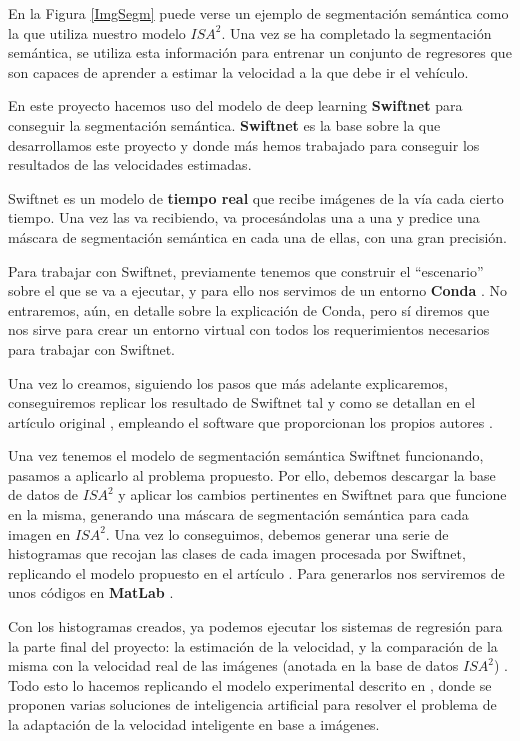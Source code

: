 En la Figura \ref{ImgSegm} puede verse un ejemplo de segmentación semántica como la que utiliza nuestro modelo $ISA^{2}$. Una vez se ha completado la segmentación semántica, se utiliza esta información para entrenar un conjunto de regresores que son capaces de aprender a estimar la velocidad a la que debe ir el vehículo.

En este proyecto hacemos uso del modelo de deep learning \textbf{Swiftnet} \cite{swiftnet} para conseguir la segmentación semántica. \textbf{Swiftnet} es la base sobre la que desarrollamos este proyecto y donde más hemos trabajado para conseguir los resultados de las velocidades estimadas.

Swiftnet es un modelo de \textbf{tiempo real} que recibe imágenes de la vía cada cierto tiempo. Una vez las va recibiendo, va procesándolas una a una y predice una máscara de segmentación semántica en cada una de ellas, con una gran precisión.

Para trabajar con Swiftnet, previamente tenemos que construir el ``escenario'' sobre el que se va a ejecutar, y para ello nos servimos de un entorno \textbf{Conda} \cite{conda}. No entraremos, aún, en detalle sobre la explicación de Conda, pero sí diremos que nos sirve para crear un entorno virtual con todos los requerimientos necesarios para trabajar con Swiftnet.

Una vez lo creamos, siguiendo los pasos que más adelante explicaremos, conseguiremos replicar los resultado de Swiftnet tal y como se detallan en el artículo original \cite{swiftnet}, empleando el software que proporcionan los propios autores \cite{github_swiftnet}.


Una vez tenemos el modelo de segmentación semántica Swiftnet funcionando, pasamos a aplicarlo al problema propuesto. Por ello, debemos descargar la base de datos de $ISA^{2}$ y aplicar los cambios pertinentes en Swiftnet para que funcione en la misma, generando una máscara de segmentación semántica para cada imagen en $ISA^{2}$. Una vez lo conseguimos, debemos generar una serie de histogramas \cite{histograma} que recojan las clases de cada imagen procesada por Swiftnet, replicando el modelo propuesto en el artículo \cite{isa2}. Para generarlos nos serviremos de unos códigos en \textbf{MatLab} \cite{matlab}.

Con los histogramas creados, ya podemos ejecutar los sistemas de regresión para la parte final del proyecto: la estimación de la velocidad, y la comparación de la misma con la velocidad real de las imágenes (anotada en la base de datos $ISA^{2}$) . Todo esto lo hacemos replicando el modelo experimental descrito en \cite{isa2}, donde se proponen varias soluciones de inteligencia artificial para resolver el problema de la adaptación de la velocidad inteligente en base a imágenes.

